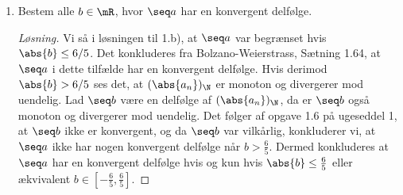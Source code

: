 \begin{opg}
\begin{enumerate}
    
    \item Bestem alle $b\in\mR$, hvor $\seq a$ har en konvergent delfølge.
    \ifanswers \begin{proof}[Løsning]
    	Vi så i løsningen til 1.b), at $ \seq a $ var begrænset hvis $ \abs{b}\leq 6/5 $. Det konkluderes fra Bolzano-Weierstrass, Sætning 1.64, at $ \seq a $ i dette tilfælde har en konvergent delfølge. Hvis derimod $ \abs{b}>6/5 $ ses det, at $ (\abs{a_n})_{\N} $ er monoton og divergerer mod uendelig. Lad $ \seq b $ være en delfølge af $ (\abs{a_n})_{\N} $, da er $ \seq b $ også monoton og divergerer mod uendelig. Det følger af opgave 1.6 på ugeseddel 1, at $ \seq b $ ikke er konvergent, og da $ \seq b $ var vilkårlig, konkluderer vi, at $ \seq a $ ikke har nogen konvergent delfølge når $ b>\frac{6}{5} $. Dermed konkluderes at $ \seq a $ har en konvergent delfølge hvis og kun hvis $ \abs{b}\leq \frac{6}{5} $ eller ækvivalent $ b\in\left[-\frac{6}{5},\frac{6}{5}\right] $. 
    \end{proof} \fi

\end{enumerate}
\end{opg}
